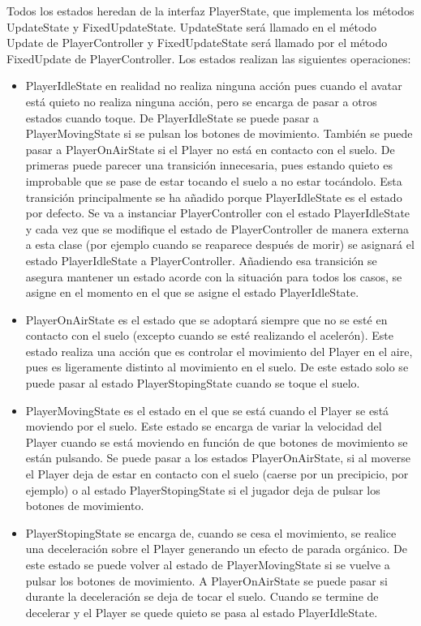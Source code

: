 Todos los estados heredan de la interfaz PlayerState, que implementa los métodos UpdateState y FixedUpdateState. UpdateState será llamado en el método Update de PlayerController y FixedUpdateState será llamado por el método FixedUpdate de PlayerController. Los estados realizan las siguientes operaciones:
\begin{itemize}
\item
PlayerIdleState en realidad no realiza ninguna acción pues cuando el avatar está quieto no realiza ninguna acción, pero se encarga de pasar a otros estados cuando toque. De PlayerIdleState se puede pasar a PlayerMovingState si se pulsan los botones de movimiento. También se puede pasar a PlayerOnAirState si el Player no está en contacto con el suelo. De primeras puede parecer una transición innecesaria, pues estando quieto es improbable que se pase de estar tocando el suelo a no estar tocándolo. Esta transición principalmente se ha añadido porque PlayerIdleState es el estado por defecto. Se va a instanciar PlayerController con el estado PlayerIdleState y cada vez que se modifique el estado de PlayerController de manera externa a esta clase (por ejemplo cuando se reaparece después de morir) se asignará el estado PlayerIdleState a PlayerController. Añadiendo esa transición se asegura mantener un estado acorde con la situación para todos los casos, se asigne en el momento en el que se asigne el estado PlayerIdleState.
\item
PlayerOnAirState es el estado que se adoptará siempre que no se esté en contacto con el suelo (excepto cuando se esté realizando el acelerón). Este estado realiza una acción que es controlar el movimiento del Player en el aire, pues es ligeramente distinto al movimiento en el suelo. De este estado solo se puede pasar al estado PlayerStopingState cuando se toque el suelo.
\item
PlayerMovingState es el estado en el que se está cuando el Player se está moviendo por el suelo. Este estado se encarga de variar la velocidad del Player cuando se está moviendo en función de que botones de movimiento se están pulsando. Se puede pasar a los estados PlayerOnAirState, si al moverse el Player deja de estar en contacto con el suelo (caerse por un precipicio, por ejemplo) o al estado PlayerStopingState si el jugador deja de pulsar los botones de movimiento.
\item
PlayerStopingState se encarga de, cuando se cesa el movimiento, se realice una deceleración sobre el Player generando un efecto de parada orgánico. De este estado se puede volver al estado de PlayerMovingState si se vuelve a pulsar los botones de movimiento. A PlayerOnAirState se puede pasar si durante la deceleración se deja de tocar el suelo. Cuando se termine de decelerar y el Player se quede quieto se pasa al estado PlayerIdleState.

\end{itemize}
